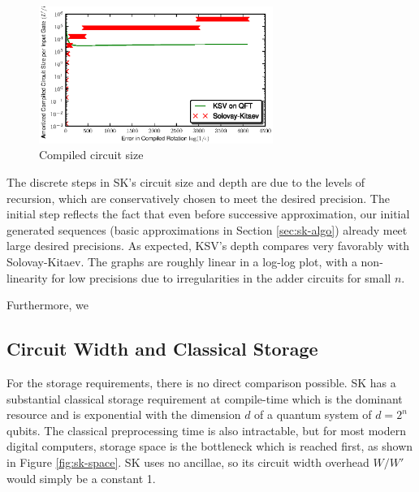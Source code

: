 \begin{center}
\begin{figure}[h!]
\label{fig:size}
\includegraphics[width=3in]{figures/ksv-size.eps}
\caption{Compiled circuit size}
\label{fig:size}
\end{figure}
\end{center}

The discrete steps in SK's circuit size and depth are due
to the levels of recursion, which are conservatively chosen to meet
the desired precision. The initial step reflects the fact that even
before successive approximation, our initial generated sequences
(basic approximations in Section \ref{sec:sk-algo}) already meet large
desired precisions. As expected, KSV's depth compares very
favorably with Solovay-Kitaev.
The graphs are roughly linear in a log-log plot, with a non-linearity
for low precisions due to irregularities in the adder circuits for small
$n$.

Furthermore, we 

\subsection{Circuit Width and Classical Storage}
\label{subsec:results-width}

For the storage requirements, there is no direct comparison possible.
SK has a substantial classical storage requirement
at compile-time which is the dominant resource and is exponential with
the dimension $d$ of a quantum system of $d=2^n$ qubits.
The classical preprocessing time is
also intractable, but for most modern digital computers, storage space is the
bottleneck which is reached first, as shown in Figure \ref{fig:sk-space}.
SK uses no ancillae, so its circuit width overhead $W/W'$ would simply be
a constant 1.


